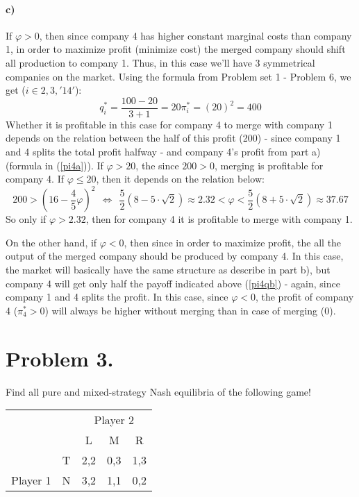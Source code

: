 \documentclass[10pt,a4paper]{article}
\begin{document}
\paragraph*{c)} If $\varphi > 0$, then since company 4 has higher constant marginal costs than company 1, in order to maximize profit (minimize cost) the merged company should shift all production to company 1. Thus, in this case we'll have 3 symmetrical companies on the market. Using the formula from Problem set 1 - Problem 6, we get ($i \in {2,3,'14'}$):
\begin{equation}
	q_i^* = \frac{100-20}{3+1}=20  \pi_i^* = \left( 20 \right)^2 = 400
\end{equation}
Whether it is profitable in this case for company 4 to merge with company 1 depends on the relation between the half of this profit (200) - since company 1 and 4 splits the total profit halfway - and company 4's profit from part a) (formula in (\ref{pi4a})). If $\varphi > 20$, the since $200>0$, merging is profitable for company 4. If $\varphi \leq 20$, then it depends on the relation below:
\begin{equation}
200>\left( 16-\frac{4}{5}\varphi \right)^2 ~~\Leftrightarrow~~ \frac{5}{2}(8-5\cdot\sqrt{2}) \approx 2.32 < \varphi <\frac{5}{2}(8+5\cdot\sqrt{2}) \approx 37.67
\end{equation}
So only if $\varphi > 2.32$, then for company 4 it is profitable to merge with company 1.

On the other hand, if $\varphi < 0$, then since in order to maximize profit, the all the output of the merged company should be produced by company 4. In this case, the market will basically have the same structure as describe in part b), but company 4 will get only half the payoff indicated above (\ref{pi4qb}) - again, since company 1 and 4 splits the profit. In this case, since $\varphi < 0$, the profit of company 4 ($\pi_4^*>0$) will always be higher without merging than in case of merging ($0$).

\break
\section*{Problem 3.}
Find all pure and mixed-strategy Nash equilibria of the following game!

\begin{center}
\begin{tabular}{ r c|c|c|c| }
& \multicolumn{1}{r}{} & \multicolumn{3}{c}{Player 2} \\
& \multicolumn{1}{r}{} &  \multicolumn{1}{c}{L} & \multicolumn{1}{c}{M} & \multicolumn{1}{c}{R} \\
\cline{3-5}
& T & 2,2 & 0,3 & 1,3 \\
\cline{3-5}
Player 1 & N & 3,2 & 1,1 & 0,2 \\
\cline{3-5}
\end{tabular}
\end{center}
\end{document}
